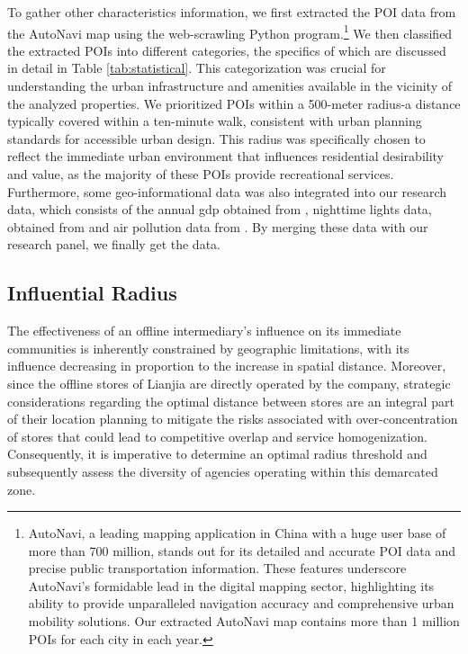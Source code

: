 \documentclass[12pt]{article}
\begin{document}
To gather other characteristics information, we first extracted the POI data from the AutoNavi map using the web-scrawling Python program.\footnote{AutoNavi, a leading mapping application in China with a huge user base of more than 700 million, stands out for its detailed and accurate POI data and precise public transportation information. These features underscore AutoNavi's formidable lead in the digital mapping sector, highlighting its ability to provide unparalleled navigation accuracy and comprehensive urban mobility solutions. Our extracted AutoNavi map contains more than 1 million POIs for each city in each year.} We then classified the extracted POIs into different categories, the specifics of which are discussed in detail in Table \ref{tab:statistical}. This categorization was crucial for understanding the urban infrastructure and amenities available in the vicinity of the analyzed properties. We prioritized POIs within a 500-meter radius-a distance typically covered within a ten-minute walk, consistent with urban planning standards for accessible urban design. This radius was specifically chosen to reflect the immediate urban environment that influences residential desirability and value, as the majority of these POIs provide recreational services. Furthermore, some geo-informational data was also integrated into our research data, which consists of the annual gdp obtained from \citep{zhao_forecasting_2017}, nighttime lights data, obtained from \citep{elvidge_annual_2021} and air pollution data from \citep{doi:10.1021/acs.est.1c05309}. By merging these data with our research panel, we finally get the data.

\subsection{Influential Radius} \label{subsec:Influential_Radius}

The effectiveness of an offline intermediary's influence on its immediate communities is inherently constrained by geographic limitations, with its influence decreasing in proportion to the increase in spatial distance. Moreover, since the offline stores of Lianjia are directly operated by the company, strategic considerations regarding the optimal distance between stores are an integral part of their location planning to mitigate the risks associated with over-concentration of stores that could lead to competitive overlap and service homogenization. Consequently, it is imperative to determine an optimal radius threshold and subsequently assess the diversity of agencies operating within this demarcated zone.
\end{document}
